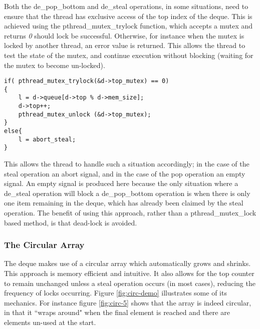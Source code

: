 Both the de\_pop\_bottom and de\_steal operations, in some situations, need to ensure that the thread has exclusive access of the 
top index of the deque.
This is achieved using the pthread\_mutex\_trylock function, which accepts a mutex and returns \textit{0} should lock be successful.
Otherwise, for instance when the mutex is locked by another thread, an error value is returned. This allows the thread to test the 
state of the mutex, and continue execution without blocking (waiting for the mutex to become un-locked).

\begin{lstlisting}[label=li:destrealtrylock,
caption=This excerpt taken from the code for the de\_steal operation shows how the pthread\_mutex\_trylock funciton is used to avoid blocking when the mutex is already locked. If the function returns \(0\) the mutex is available otherwise the else clause is taken.]
if( pthread_mutex_trylock(&d->top_mutex) == 0)
{
    l = d->queue[d->top % d->mem_size];
    d->top++;
    pthread_mutex_unlock (&d->top_mutex);
}
else{
    l = abort_steal;
}
\end{lstlisting}

This allows the thread to handle such a situation accordingly; in the case of the steal operation an abort signal, and in the case
of the pop operation an empty signal. An empty signal is produced here because the only situation where a de\_steal operation will block 
a de\_pop\_bottom operation is when there is only one item remaining in the deque, which has already been claimed by the steal operation.
The benefit of using this approach, rather than a pthread\_mutex\_lock based method, is that \gls{dead-lock} is avoided.

\subsubsection*{The Circular Array}



The deque makes use of a \gls{circular array} which automatically grows and shrinks.
This approach is memory efficient and intuitive. 
It also allows for the top counter to remain unchanged unless a steal operation occurs (in most cases), reducing the frequency of locks occurring.
Figure \ref{fig:circ-demo} illustrates some of its mechanics. For instance figure \ref{fig:circ-5} shows that the array is indeed circular, in that it
``wraps around" when the final element is reached and there are elements un-used at the start.

